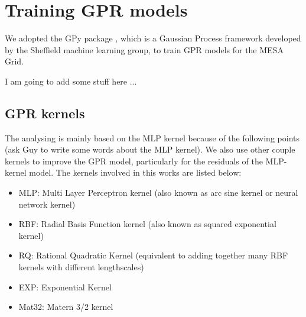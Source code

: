 \section{Training GPR models}\label{GPR}

We adopted the GPy package \citep{gpy2014}, which is a Gaussian Process framework developed by the Sheffield machine learning group, to train GPR models for the \textsc{MESA} Grid. 

I am going to add some stuff here ...

\subsection{GPR kernels}
The analysing is mainly based on the MLP kernel because of the following points (ask Guy to write some words about the MLP kernel).
We also use other couple kernels to improve the GPR model, particularly for the residuals of the MLP-kernel model.  
The kernels involved in this works are listed below:

\begin{itemize}
\item MLP: Multi Layer Perceptron kernel (also known as arc sine kernel or neural network kernel)
\item RBF: Radial Basis Function kernel (also known as squared exponential kernel)
\item RQ: Rational Quadratic Kernel (equivalent to adding together many RBF kernels with different lengthscales)
\item EXP: Exponential Kernel
\item Mat32: Matern 3/2 kernel
\end{itemize}

